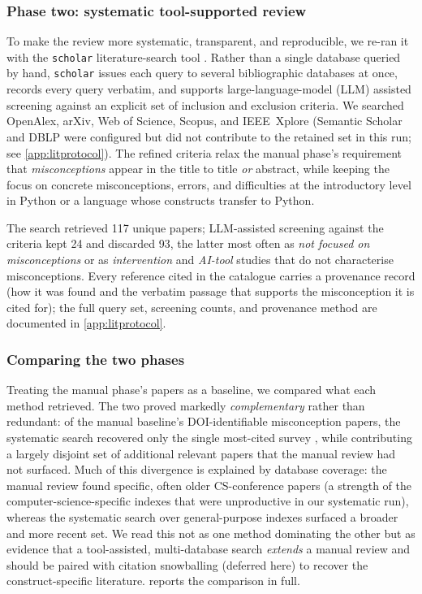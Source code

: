\subsubsection{Phase two: systematic tool-supported review}

To make the review more systematic, transparent, and reproducible, we re-ran it
with the \texttt{scholar} literature-search tool \autocite{scholar}. Rather than
a single database queried by hand, \texttt{scholar} issues each query to several
bibliographic databases at once, records every query verbatim, and supports
large-language-model (LLM) assisted screening against an explicit set of
inclusion and exclusion criteria. We searched OpenAlex, arXiv, Web of Science,
Scopus, and IEEE~Xplore (Semantic Scholar and DBLP were configured but did not
contribute to the retained set in this run; see \cref{app:litprotocol}). The
refined criteria relax the manual phase's requirement that \emph{misconceptions}
appear in the title to title \emph{or} abstract, while keeping the focus on
concrete misconceptions, errors, and difficulties at the introductory level in
Python or a language whose constructs transfer to Python.

The search retrieved \num{117} unique papers; LLM-assisted screening against the
criteria kept \num{24} and discarded \num{93}, the latter most often as
\emph{not focused on misconceptions} or as \emph{intervention} and
\emph{AI-tool} studies that do not characterise misconceptions. Every reference
cited in the catalogue carries a provenance record (how it was found and the
verbatim passage
that supports the misconception it is cited for); the full query set, screening
counts, and provenance method are documented in \cref{app:litprotocol}.

\subsubsection{Comparing the two phases}
\label{sec:method-comparison}

Treating the manual phase's papers as a baseline, we compared what each method
retrieved. The two proved markedly \emph{complementary} rather than redundant:
of the manual baseline's DOI-identifiable misconception papers, the systematic
search recovered only the single most-cited survey
\autocite{MisconceptionsSurvey2017}, while contributing a largely disjoint set
of additional relevant papers that the manual review had not surfaced. Much of
this divergence is explained by database coverage: the manual review found
specific, often older CS-conference papers (a strength of the
computer-science-specific indexes that were unproductive in our systematic run),
whereas the systematic search over general-purpose indexes surfaced a broader
and more recent set. We read this not as one method dominating the other but as
evidence that a tool-assisted, multi-database search \emph{extends} a manual
review and should be paired with citation snowballing (deferred here) to recover
the construct-specific literature.  reports the comparison
in full.

